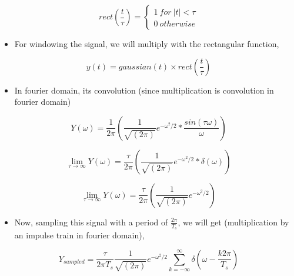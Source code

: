 \documentclass[11pt, a4paper]{article}
\begin{document}
\begin{equation}
rect(\frac{t}{\tau}) =
\begin{cases}
1\  for\ |t| < \tau \\
0\ otherwise
\end{cases}
\end{equation}

\begin{itemize}

\item
  For windowing the signal, we will multiply with the rectangular
  function,
\end{itemize}

\begin{equation}
y(t) = gaussian(t) \times rect(\frac{t}{\tau})
\end{equation}

\begin{itemize}

\item
  In fourier domain, its convolution (since multiplication is
  convolution in fourier domain)
\end{itemize}

\begin{equation}
Y(\omega) = \frac{1}{2\pi}(\frac{1}{\sqrt{(2\pi)}}e^{-\omega^2/2} * \frac{sin(\tau \omega)}{\omega})
\end{equation}

\begin{equation}
\lim_{\tau \to\infty} Y(\omega) = \frac{\tau}{2\pi}(\frac{1}{\sqrt{(2\pi)}}e^{-\omega^2/2} * \delta(\omega))
\end{equation}

\begin{equation}
\lim_{\tau \to\infty} Y(\omega) = \frac{\tau}{2\pi}(\frac{1}{\sqrt{(2\pi)}}e^{-\omega^2/2})
\end{equation}

\begin{itemize}

\item
  Now, sampling this signal with a period of \(\frac{2\pi}{T_s}\), we
  will get (multiplication by an impulse train in fourier domain),
\end{itemize}

\begin{equation}
Y_{sampled} = \frac{\tau}{2\pi T_s}\frac{1}{\sqrt{(2\pi)}}e^{-\omega^2/2} \sum_{k = -\infty}^{\infty}\delta(\omega - \frac{k2\pi}{T_s})
\end{equation}
\end{document}
